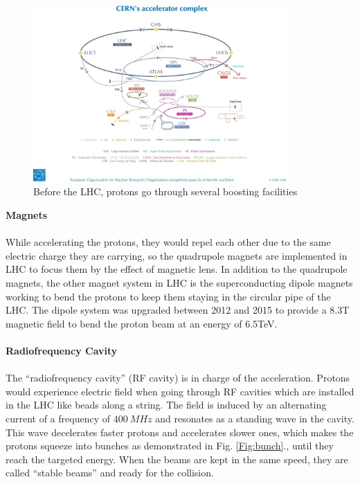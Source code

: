 \\
\begin{figure}[!h]                
	\includegraphics[width=0.86\textwidth]{Chapter2/pre-acceleration.jpg}
	\centering
	\begin{center}
		\caption{Before the LHC, protons go through several boosting facilities}
		\label{Fig:boost}            
	\end{center}
\end{figure}
{\bf Magnets}
\\
\\While accelerating the protons, they  would repel each other due to the same electric charge they are carrying, so the quadrupole magnets are implemented in LHC to focus them by the effect of magnetic lens. In addition to the quadrupole magnets, the other magnet system in LHC is the superconducting dipole magnets working to bend the protons to keep them staying in the circular pipe of the LHC. The dipole system was upgraded between 2012 and 2015 to provide a 8.3T magnetic field to bend the proton beam at an energy of 6.5TeV.
\\
\\{\bf Radiofrequency Cavity}  
\\
\\The ``radiofrequency cavity'' (RF cavity) is in charge of the acceleration. Protons would experience electric field when going through RF cavities which are installed in the LHC like beads along a string. The field is induced by an alternating current of a frequency of $400~MHz$ and resonates as a standing wave in the cavity. This wave decelerates faster protons and accelerates slower ones, which makes the protons squeeze into bunches as demonstrated in Fig. \ref{Fig:bunch}., until they reach the targeted energy. When the beams are kept in the same speed, they are called ``stable beams'' and ready for the collision. 
